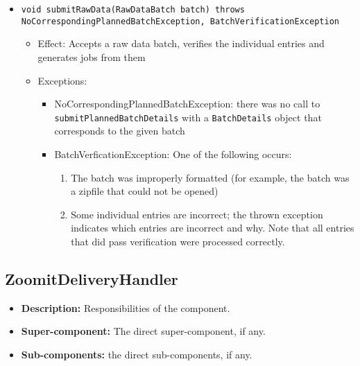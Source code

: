 \begin{itemize}
\begin{itemize}
    	\item \texttt{void submitRawData(RawDataBatch batch) throws NoCorrespondingPlannedBatchException, BatchVerificationException}
    	\begin{itemize}
    		\item Effect: Accepts a raw data batch, verifies the individual entries and generates jobs from them
    		\item Exceptions:
    		\begin{itemize}
    			\item NoCorrespondingPlannedBatchException: there was no call to \texttt{submitPlannedBatchDetails} with a \texttt{BatchDetails} object that corresponds to the given batch
    			\item BatchVerficationException: One of the following occurs:
    			\begin{enumerate}
    				\item The batch was improperly formatted (for example, the batch was a zipfile that could not be opened)
    				\item Some individual entries are incorrect; the thrown exception indicates which entries are incorrect and why. Note that all entries that did pass verification were processed correctly.
    			\end{enumerate} 
    		\end{itemize}
    	\end{itemize}
    \end{itemize}
\end{itemize}

\subsection{ZoomitDeliveryHandler}
\begin{itemize}
    \item \textbf{Description:} Responsibilities of the component.
    \item \textbf{Super-component:} The direct super-component, if any.
    \item \textbf{Sub-components:} the direct sub-components, if any.
\end{itemize}

